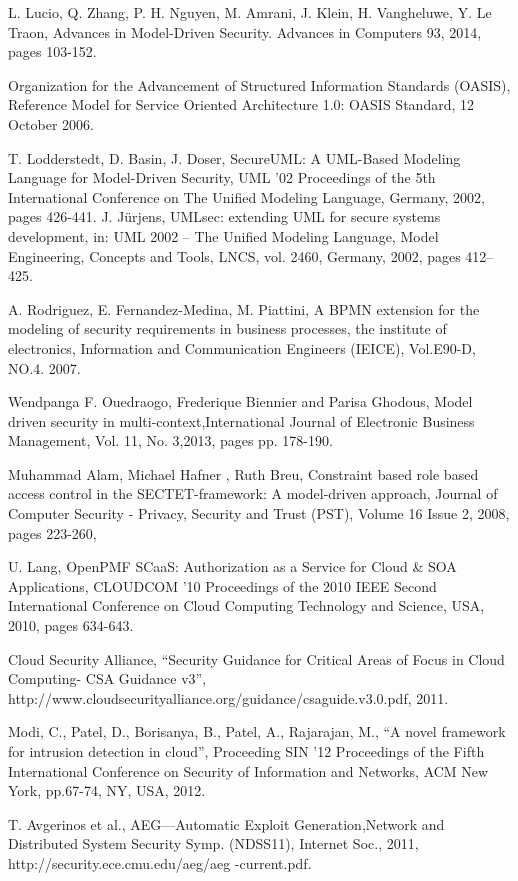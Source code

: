 \documentclass[runningheads,a4paper]{llncs}
\begin{document}
\begin{thebibliography}{4}
 L. Lucio, Q. Zhang, P. H. Nguyen, M. Amrani, J. Klein, H. Vangheluwe, Y. Le Traon, Advances in Model-Driven Security. Advances in Computers 93, 2014, pages 103-152.

 Organization for the Advancement of Structured Information Standards (OASIS), Reference Model for Service Oriented Architecture 1.0: OASIS Standard, 12 October 2006.


 T. Lodderstedt, D. Basin, J. Doser, SecureUML: A UML-Based Modeling Language for Model-Driven Security, UML '02 Proceedings of the 5th International Conference on The Unified Modeling Language,  Germany, 2002, pages 426-441.
 J. Jürjens, UMLsec: extending UML for secure systems development, in: UML 2002 – The Unified Modeling Language, Model Engineering, Concepts and Tools, LNCS, vol. 2460, Germany, 2002, pages 412–425.
    
 A. Rodriguez, E. Fernandez-Medina, M. Piattini, A BPMN extension for the modeling of security requirements in business processes, the institute of electronics, Information and Communication Engineers (IEICE), Vol.E90-D, NO.4. 2007.

 Wendpanga F. Ouedraogo, Frederique Biennier and Parisa Ghodous, Model driven security in multi-context,International Journal of Electronic Business Management, Vol. 11, No. 3,2013, pages pp. 178-190.  


 Muhammad Alam, Michael Hafner ,	Ruth Breu, Constraint based role based access control in the SECTET-framework: A model-driven approach, Journal of Computer Security - Privacy, Security and Trust (PST), Volume 16 Issue 2, 2008, pages 223-260,

 U. Lang, OpenPMF SCaaS: Authorization as a Service for Cloud \& SOA Applications, CLOUDCOM '10 Proceedings of the 2010 IEEE Second International Conference on Cloud Computing Technology and Science, USA, 2010, pages 634-643. 

 Cloud Security Alliance, “Security Guidance for Critical Areas of Focus in Cloud Computing- CSA Guidance v3”, http://www.cloudsecurityalliance.org/guidance/csaguide.v3.0.pdf, 2011.

 Modi, C., Patel, D., Borisanya, B., Patel, A., Rajarajan, M., “A novel framework for intrusion detection in cloud”, Proceeding SIN '12 Proceedings of the Fifth International Conference on Security of Information and Networks, ACM New York, pp.67-74, NY, USA, 2012.

 T. Avgerinos et al., AEG—Automatic Exploit Generation,Network and Distributed System Security Symp.
(NDSS11), Internet Soc., 2011, http://security.ece.cmu.edu/aeg/aeg
-current.pdf.
\end{thebibliography}
\end{document}
